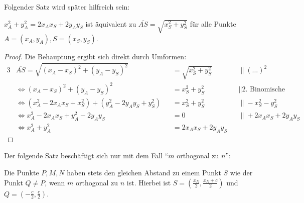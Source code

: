 Folgender Satz wird später hilfreich sein:
\begin{thm}\label{cor_hilfe}
        $x_A^2+y_A^2=2x_Ax_S+2y_Ay_S$ ist äquivalent zu $\overline{AS}=\sqrt{x_S^2+y_S^2}$ für alle 
        Punkte $A=(x_A, y_A), S=(x_S, y_S)$.
\end{thm}
\begin{proof}
    Die Behauptung ergibt sich direkt durch Umformen:
    \begin{alignat*}{3}
        &\overline{AS}=\sqrt{(x_A-x_S)^2+(y_A-y_S)^2}&&=\sqrt{x_S^2+y_S^2}\quad&&\|(\ldots)^2\\
        &\Leftrightarrow (x_A-x_S)^2+(y_A-y_S)^2&&=x_S^2+y_S^2\quad &&\|\text{2. Binomische Formel}\\
        &\Leftrightarrow (x_A^2-2x_Ax_S+x_S^2)+(y_A^2-2y_Ay_S+y_S^2)&&=x_S^2+y_S^2\quad &&\|-x_S^2-y_S^2\\
        &\Leftrightarrow x_A^2-2x_Ax_S+y_A^2-2y_Ay_S&&=0\quad &&\|+2x_Ax_S+2y_Ay_S\\
        &\Leftrightarrow x_A^2+y_A^2&&=2x_Ax_S+2y_Ay_S&&
    \end{alignat*}
\end{proof}
Der folgende Satz beschäftigt sich nur mit dem Fall "`$m$ orthogonal zu $n$"':
\begin{thm}\label{aufgabe_3}
    Die Punkte $P, M, N$ haben stets den gleichen Abstand zu einem Punkt $S$ wie der Punkt $Q\neq P$, wenn $m$ 
    orthogonal zu $n$ ist. Hierbei ist $S=\left(\frac{x_N}{2}, \frac{x_N+c}{2}\right)$ und $Q=\left(-\frac{c}{2}, 
    \frac{c}{2}\right)$.
\end{thm}
